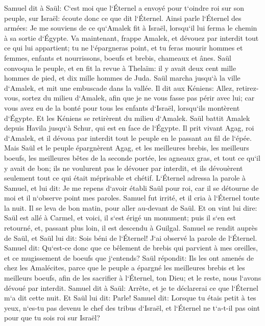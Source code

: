 \verse Samuel dit à Saül: C`est moi que l`Éternel a envoyé pour t`oindre roi sur son peuple, sur Israël: écoute donc ce que dit l`Éternel. 
\verse Ainsi parle l`Éternel des armées: Je me souviens de ce qu`Amalek fit à Israël, lorsqu`il lui ferma le chemin à sa sortie d`Égypte. 
\verse Va maintenant, frappe Amalek, et dévouez par interdit tout ce qui lui appartient; tu ne l`épargneras point, et tu feras mourir hommes et femmes, enfants et nourrissons, boeufs et brebis, chameaux et ânes. 
\verse Saül convoqua le peuple, et en fit la revue à Thelaïm: il y avait deux cent mille hommes de pied, et dix mille hommes de Juda. 
\verse Saül marcha jusqu`à la ville d`Amalek, et mit une embuscade dans la vallée. 
\verse Il dit aux Kéniens: Allez, retirez-vous, sortez du milieu d`Amalek, afin que je ne vous fasse pas périr avec lui; car vous avez eu de la bonté pour tous les enfants d`Israël, lorsqu`ils montèrent d`Égypte. Et les Kéniens se retirèrent du milieu d`Amalek. 
\verse Saül battit Amalek depuis Havila jusqu`à Schur, qui est en face de l`Égypte. 
\verse Il prit vivant Agag, roi d`Amalek, et il dévoua par interdit tout le peuple en le passant au fil de l`épée. 
\verse Mais Saül et le peuple épargnèrent Agag, et les meilleures brebis, les meilleurs boeufs, les meilleures bêtes de la seconde portée, les agneaux gras, et tout ce qu`il y avait de bon; ils ne voulurent pas le dévouer par interdit, et ils dévouèrent seulement tout ce qui était méprisable et chétif. 
\verse L`Éternel adressa la parole à Samuel, et lui dit: 
\verse Je me repens d`avoir établi Saül pour roi, car il se détourne de moi et il n`observe point mes paroles. Samuel fut irrité, et il cria à l`Éternel toute la nuit. 
\verse Il se leva de bon matin, pour aller au-devant de Saül. Et on vint lui dire: Saül est allé à Carmel, et voici, il s`est érigé un monument; puis il s`en est retourné, et, passant plus loin, il est descendu à Guilgal. 
\verse Samuel se rendit auprès de Saül, et Saül lui dit: Sois béni de l`Éternel! J`ai observé la parole de l`Éternel. 
\verse Samuel dit: Qu`est-ce donc que ce bêlement de brebis qui parvient à mes oreilles, et ce mugissement de boeufs que j`entends? 
\verse Saül répondit: Ils les ont amenés de chez les Amalécites, parce que le peuple a épargné les meilleures brebis et les meilleurs boeufs, afin de les sacrifier à l`Éternel, ton Dieu; et le reste, nous l`avons dévoué par interdit. 
\verse Samuel dit à Saül: Arrête, et je te déclarerai ce que l`Éternel m`a dit cette nuit. Et Saül lui dit: Parle! 
\verse Samuel dit: Lorsque tu étais petit à tes yeux, n`es-tu pas devenu le chef des tribus d`Israël, et l`Éternel ne t`a-t-il pas oint pour que tu sois roi sur Israël? 
